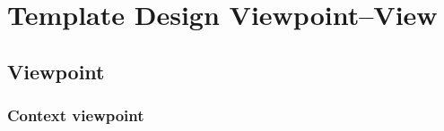 \chapter{Template Design Viewpoint--View} \label{chp:template-vpv}
	\section{Viewpoint} \label{s:template-vpv-viewpoint}		
		\subsection{Context viewpoint} \label{s:template-vpv:context-viewpoint}
			\begin{comment}
				The Context viewpoint depicts services provided by a design subject with reference to an explicit context.
				That context is defined by reference to actors that include users and other stakeholders, which interact with
				the design subject in its environment. The Context viewpoint provides a “black box” perspective on the
				design subject.
				Services depict an inherently functional aspect or anticipated cases of use of the design subject (hence “use
				cases” in UML). Stratification of services and their descriptions in the form of scenarios of actors’
				interactions with the system provide a mechanism for adding detail. Services may also be associated with
				actors through information flows. The content and manner of information exchange with the environment
				implies additional design information and the need for additional viewpoints (see 5.10).
				A Deployment overlay to a Context view can be transformed into a Deployment view whenever the
				execution hardware platform is part of the design subject; for stand-alone software design, a Deployment
				overlay maps software entities onto externally available entities not subject of the current design effort.
				Similarly, work allocation to teams and other management perspectives are overlays in the design.
			\end{comment}
			
